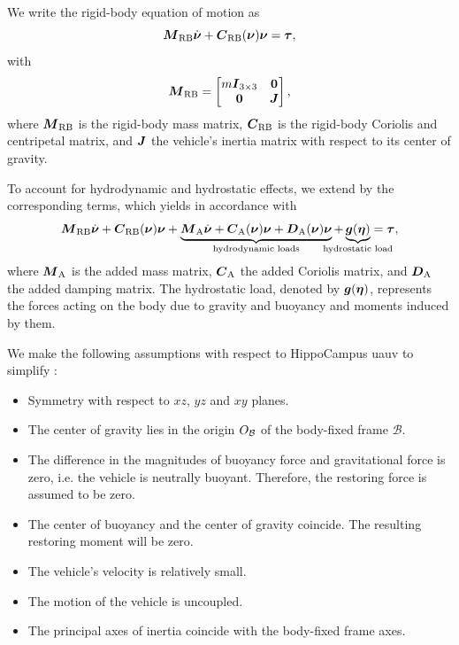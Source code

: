 We write the rigid-body equation of motion as
\begin{equation}
	\label{eq:rigid-body-equation-of-motion}
	\mbox{$\bm{M}$}_\text{RB} \mbox{$\dot{\bm{\nu}}$}
	+ \mbox{$\bm{C}$}_\text{RB}(\mbox{$\bm{\nu}$}) \mbox{$\bm{\nu}$}
	= \mbox{$\bm{\tau}$}
	,
\end{equation}
with
\begin{equation}
	\label{eq:rigid-body-mass-matrix}
	\mbox{$\bm{M}$}_\text{RB} =
	\begin{bmatrix}
		m \mbox{$\bm{I}$}_{3 \times 3} & \bm{0} \\
		\bm{0} & \mbox{$\bm{J}$}
	\end{bmatrix}
	,
\end{equation}
where $\mbox{$\bm{M}$}_\text{RB}$ is the rigid-body mass matrix, $\mbox{$\bm{C}$}_\text{RB}$ is the rigid-body Coriolis and centripetal matrix, and $\mbox{$\bm{J}$}$ the vehicle's inertia matrix with respect to its center of gravity.

To account for hydrodynamic and hydrostatic effects, we extend  by the corresponding terms, which yields in accordance with \cite{Fossen11}
\begin{equation}
	\label{eq:6dof-equation-of-motion}
	\Mrigid \nubp + \Crigid(\nub) \nub +
	\underbrace{
		\Madded \nubp +
		\Cadded(\nub) \nub +
		\Dadded(\nub) \nub
	}_\text{hydrodynamic loads}
	+ 
	\underbrace{
		\gb(\etab)
	}_\text{\makebox[0pt]{hydrostatic load}}
	= \taub
	,
\end{equation}
where $\mbox{$\bm{M}$}_\text{A}$ is the added mass matrix, $\mbox{$\bm{C}$}_\text{A}$ the added Coriolis matrix, and $\mbox{$\bm{D}$}_\text{A}$ the added damping matrix.
The hydrostatic load, denoted by $\mbox{$\bm{g}$}(\mbox{$\bm{\eta}$})$, represents the forces acting on the body due to gravity and buoyancy and moments induced by them.

We make the following assumptions with respect to HippoCampus \ac{uauv} to simplify :
\begin{itemize}
	\item Symmetry with respect to $xz$, $yz$ and $xy$ planes.
	\item The center of gravity lies in the origin $O_{\mathcal{B}}$ of the body-fixed frame $\mathcal{B}$.
	\item The difference in the magnitudes of buoyancy force and gravitational force is zero, i.e. the vehicle is neutrally buoyant. Therefore, the restoring force is assumed to be zero.
	\item The center of buoyancy and the center of gravity coincide. The resulting restoring moment will be zero.
	\item The vehicle's velocity is relatively small.
	\item The motion of the vehicle is uncoupled.
	\item The principal axes of inertia coincide with the body-fixed frame axes.
\end{itemize}

